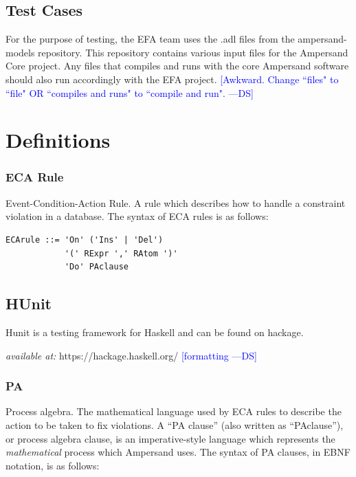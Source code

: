 \documentclass[12pt, svgnames]{article}
\newcommand{\authornote}[3]{\textcolor{#1}{[#3 ---#2]}}
\newcommand{\authornote}[3]{}
\newcommand{\ds}[1]{\authornote{blue}{DS}{#1}}
\begin{document}
\subsection{Test Cases}
For the purpose of testing, the EFA team uses the .adl files from the ampersand-models repository. This repository contains various input files for the Ampersand Core project. Any files that compiles and runs with the core Ampersand software should also run accordingly with the EFA project. 
\ds{Awkward. Change ``files" to ``file" OR ``compiles and runs" to ``compile and run".}

\section{Definitions}\label{sec:Abbrev}

\subsubsection*{ECA Rule}
 Event-Condition-Action Rule. A rule which describes how to handle a constraint
 violation in a database. The syntax of ECA rules is as follows:
 

\begin{lstlisting}[basicstyle=\ttfamily]
ECArule ::= 'On' ('Ins' | 'Del') 
            '(' RExpr ',' RAtom ')'
            'Do' PAclause    
\end{lstlisting}

\subsection*{HUnit}
Hunit is a testing framework for Haskell and can be found on 
hackage\cite{rwhaskell}.

\textit{available at:} https://hackage.haskell.org/
\ds{formatting}

\subsubsection*{PA}
Process algebra. The mathematical language used by ECA rules to describe the
action to be taken to fix violations. A ``PA clause'' (also written as
``PAclause''), or process algebra clause, is an imperative-style language which
represents the \emph{mathematical} process which Ampersand uses. The syntax of
PA clauses, in EBNF notation, is as follows:
\end{document}
